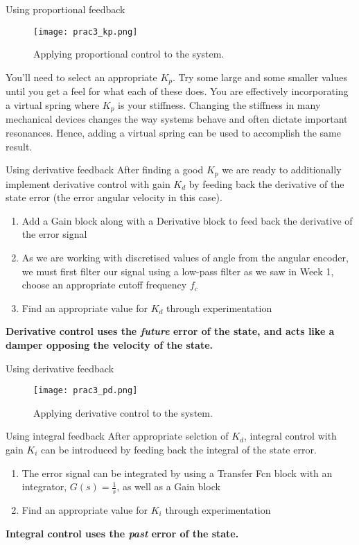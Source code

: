 \documentclass[9pt]{beamer-control}
\begin{document}
\begin{frame}{Using proportional feedback}
	\begin{figure}
		\centering
		\texttt{[image: prac3\_kp.png]}
		\caption{Applying proportional control to the system.}
	\end{figure}
	You’ll need to select an appropriate $K_p.$ Try some large and some smaller values until you get a feel for what each of these does. You are effectively incorporating a virtual spring where $K_p$ is your stiffness. Changing the stiffness in many mechanical devices changes the way systems behave and often dictate important resonances. Hence, adding a virtual spring can be used to accomplish the same result.
\end{frame}




\begin{frame}{Using derivative feedback}
After finding a good $K_p$ we are ready to additionally implement derivative control with gain $K_d$ by feeding back the derivative of the state error (the error angular velocity in this case).

\begin{enumerate}
	\item Add a Gain block along with a Derivative block to feed back the derivative of the error signal
	\item As we are working with discretised values of angle from the angular encoder, we must first filter our signal using a low-pass filter as we saw in Week 1, choose an appropriate cutoff frequency $f_c$
	\item Find an appropriate value for $K_d$ through experimentation
\end{enumerate}

\textbf{Derivative control uses the \textit{future} error of the state, and acts like a damper opposing the velocity of the state.}
\end{frame}

\begin{frame}{Using derivative feedback}
		\begin{figure}
		\centering
		\texttt{[image: prac3\_pd.png]}
		\caption{Applying derivative control to the system.}
	\end{figure}
\end{frame}


\begin{frame}{Using integral feedback}
After appropriate selction of $K_d$, integral control with gain $K_i$ can be introduced by feeding back the integral of the state error. 

\begin{enumerate}
	\item The error signal can be integrated by using a Transfer Fcn block with an integrator, $G(s)=\tfrac{1}{s}$, as well as a Gain block
	\item Find an appropriate value for $K_i$ through experimentation
\end{enumerate}


\textbf{Integral control uses the \textit{past} error of the state.}
\end{frame}
\end{document}

